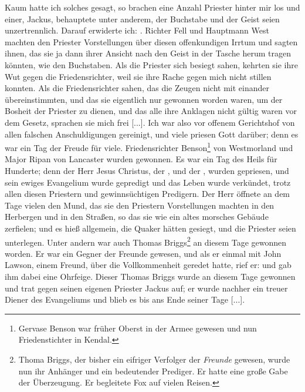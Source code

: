 Kaum
hatte ich solches gesagt, so brachen eine Anzahl Priester hinter
mir los und einer, Jackus, behauptete unter anderem, der
Buchstabe und der Geist seien unzertrennlich. Darauf erwiderte
ich: . Richter Fell und Hauptmann West machten den Priester
Vorstellungen über diesen offenkundigen Irrtum und sagten ihnen,
das sie ja dann ihrer Ansicht nach den Geist in der Tasche herum
tragen könnten, wie den Buchstaben. Als die Priester sich besiegt
sahen, kehrten sie ihre Wut gegen die Friedensrichter, weil sie
ihre Rache gegen mich nicht stillen konnten. Als die 
Friedensrichter sahen, das die Zeugen nicht mit einander übereinstimmten,
und das sie eigentlich nur gewonnen worden waren, um der
Bosheit der Priester zu dienen, und das alle ihre Anklagen nicht
gültig waren vor dem Gesetz, sprachen sie mich frei [...]. Ich
war also vor offenem Gerichtshof von allen falschen 
Anschuldigungen gereinigt, und viele priesen Gott darüber; 
denn es war
ein Tag der Freude für viele. Friedensrichter 
Benson\footnote{Gervase Benson war früher Oberst in der 
Armee gewesen und nun
Friedenstichter in Kendal.} von Westmorland und Major Ripan
von Lancaster wurden gewonnen.
Es war ein Tag des Heils für Hunderte; denn der Herr Jesus
Christus, der , und der , wurden gepriesen, und sein 
ewiges Evangelium wurde gepredigt und das Leben wurde verkündet, 
trotz allen diesen Priestern
und gewinnsüchtigen Predigern. Der Herr öffnete an dem Tage
vielen den Mund, das sie den Priestern Vorstellungen machten
in den Herbergen und in den Straßen, so das sie wie ein altes
morsches Gebäude zerfielen; und es hieß allgemein, die Quaker
hätten gesiegt, und die Priester seien unterlegen. Unter andern
war auch Thomas Briggs\footnote{Thoma Briggs, der bisher 
ein eifriger Verfolger der \textit{Freunde} gewesen, 
wurde nun ihr Anhänger und ein bedeutender Prediger. 
Er hatte eine große Gabe der Überzeugung. Er begleitete 
Fox auf vielen Reisen.} an diesem 
Tage gewonnen worden. Er
war ein Gegner der Freunde gewesen, und als er einmal mit
John Lawson, einem Freund, über die Vollkommenheit geredet hatte,
rief er:  und gab ihm dabei
eine Ohrfeige. Dieser Thomas Briggs wurde an diesem Tage
gewonnen und trat gegen seinen eigenen 
Priester Jackus auf; er
wurde nachher ein treuer Diener des Evangeliums und blieb es
bis ans Ende seiner Tage [...].
